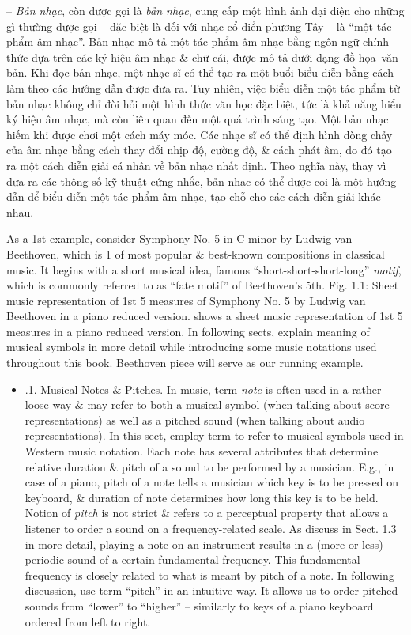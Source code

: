 \documentclass{article}
\begin{document}
\begin{itemize}
\begin{itemize}
		-- {\it Bản nhạc}, còn được gọi là {\it bản nhạc}, cung cấp một hình ảnh đại diện cho những gì thường được gọi -- đặc biệt là đối với nhạc cổ điển phương Tây -- là ``một tác phẩm âm nhạc''. Bản nhạc mô tả một tác phẩm âm nhạc bằng ngôn ngữ chính thức dựa trên các ký hiệu âm nhạc \& chữ cái, được mô tả dưới dạng đồ họa--văn bản. Khi đọc bản nhạc, một nhạc sĩ có thể tạo ra một buổi biểu diễn bằng cách làm theo các hướng dẫn được đưa ra. Tuy nhiên, việc biểu diễn một tác phẩm từ bản nhạc không chỉ đòi hỏi một hình thức văn học đặc biệt, tức là khả năng hiểu ký hiệu âm nhạc, mà còn liên quan đến một quá trình sáng tạo. Một bản nhạc hiếm khi được chơi một cách máy móc. Các nhạc sĩ có thể định hình dòng chảy của âm nhạc bằng cách thay đổi nhịp độ, cường độ, \& cách phát âm, do đó tạo ra một cách diễn giải cá nhân về bản nhạc nhất định. Theo nghĩa này, thay vì đưa ra các thông số kỹ thuật cứng nhắc, bản nhạc có thể được coi là một hướng dẫn để biểu diễn một tác phẩm âm nhạc, tạo chỗ cho các cách diễn giải khác nhau.
		
		As a 1st example, consider Symphony No. 5 in C minor by {\sc Ludwig van Beethoven}, which is 1 of most popular \& best-known compositions in classical music. It begins with a short musical idea, famous ``short-short-short-long'' {\it motif}, which is commonly referred to as ``fate motif'' of {\sc Beethoven}'s 5th. {\sf Fig. 1.1: Sheet music representation of 1st 5 measures of Symphony No. 5 by {\sc Ludwig van Beethoven} in a piano reduced version.} shows a sheet music representation of 1st 5 measures in a piano reduced version. In following sects, explain meaning of musical symbols in more detail while introducing some music notations used throughout this book. Beethoven piece will serve as our running example.
		\begin{itemize}
			\item {.1. Musical Notes \& Pitches.} In music, term {\it note} is often used in a rather loose way \& may refer to both a musical symbol (when talking about score representations) as well as a pitched sound (when talking about audio representations). In this sect, employ term to refer to musical symbols used in Western music notation. Each note has several attributes that determine relative duration \& pitch of a sound to be performed by a musician. E.g., in case of a piano, pitch of a note tells a musician which key is to be pressed on keyboard, \& duration of note determines how long this key is to be held. Notion of {\it pitch} is not strict \& refers to a perceptual property that allows a listener to order a sound on a frequency-related scale. As discuss in Sect. 1.3 in more detail, playing a note on an instrument results in a (more or less) periodic sound of a certain fundamental frequency. This fundamental frequency is closely related to what is meant by pitch of a note. In following discussion, use term ``pitch'' in an intuitive way. It allows us to order pitched sounds from ``lower'' to ``higher'' -- similarly to keys of a piano keyboard ordered from left to right.
			

\end{itemize}
\end{itemize}
\end{itemize}
\end{document}
